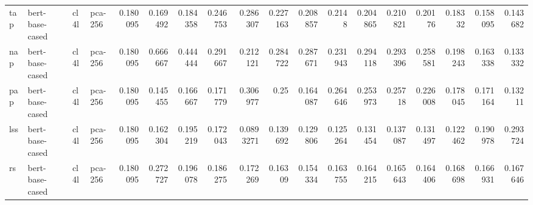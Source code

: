 \begin{tabular}{llllrrrrrrrrrrrrrr}
 tap         & bert-base-cased     & cl4l             & pca-256               &         0.180095 &        0.169492  &         0.184358 &         0.246753 &        0.286307  &         0.227163 &         0.208857 &         0.2148   &         0.204865 &         0.210821 &          0.20176  &          0.18332  &          0.158095 &          0.143682 \\
 nap         & bert-base-cased     & cl4l             & pca-256               &         0.180095 &        0.666667  &         0.444444 &         0.291667 &        0.212121  &         0.284722 &         0.287671 &         0.231943 &         0.294118 &         0.293396 &          0.258581 &          0.198243 &          0.163338 &          0.133332 \\
 pap         & bert-base-cased     & cl4l             & pca-256               &         0.180095 &        0.145455  &         0.166667 &         0.171779 &        0.306977  &         0.25     &         0.164087 &         0.264646 &         0.253973 &         0.25718  &          0.226008 &          0.178045 &          0.171164 &          0.13211  \\
 lss         & bert-base-cased     & cl4l             & pca-256               &         0.180095 &        0.162304  &         0.195219 &         0.172043 &        0.0893271 &         0.139692 &         0.129806 &         0.125264 &         0.131454 &         0.137087 &          0.131497 &          0.122462 &          0.190978 &          0.293724 \\
 rs          & bert-base-cased     & cl4l             & pca-256               &         0.180095 &        0.272727  &         0.196078 &         0.186275 &        0.172269  &         0.16309  &         0.154334 &         0.163755 &         0.164215 &         0.165643 &          0.164406 &          0.168698 &          0.166931 &          0.167646 \\
\hline
\end{tabular}